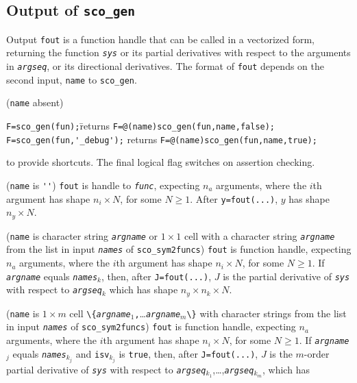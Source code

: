 \documentclass[11pt]{scrartcl}
\newcommand{\blist}[1]{\mbox{\lstinline!#1!}}
\newcommand{\genvar}[1]{\textit{\texttt{#1}}}
\begin{document}
\subsection{Output of \blist{sco_gen}}\label{sec:sco_gen:output}
Output \blist{fout} is a function handle that can be called in a
vectorized form, returning the function \genvar{sys} or its partial
derivatives with respect to the arguments in \genvar{argseq}, or its
directional derivatives. The format of \blist{fout} depends on the second input, \blist{name} to \blist{sco_gen}.
\begin{compactenum}[(i)]
\item (\blist{name} absent)
  \begin{tabbing}
    \blist{F=sco_gen(fun);}\qquad\qquad\quad\= returns 
    \blist{F=@(name)sco_gen(fun,name,false);}\\
    \blist{F=sco_gen(fun,'_debug');}\> returns 
    \blist{F=@(name)sco_gen(fun,name,true);}
  \end{tabbing}
  to provide shortcuts. The final logical flag switches on assertion checking.
\item (\blist{name} is \blist{''}) \blist{fout} is handle to \genvar{func}, expecting
  $n_a$ arguments, where the $i$th argument has shape $n_i\times N$,
  for some $N\geq 1$. After \blist{y=fout(...)}, $y$ has shape
  $n_y\times N$.
\item\label{ch1:out} (\blist{name} is character string \genvar{argname} or $1\times1$ cell with a
  character string \genvar{argname} from the list in input
  \genvar{names} of \blist{sco_sym2funcs}) \blist{fout} is function
  handle, expecting $n_a$ arguments, where the $i$th argument has
  shape $n_i\times N$, for some $N\geq 1$. If \genvar{argname}
  equals \genvar{names}$_k$, then, after \blist{J=fout(...)}, $J$ is
  the partial derivative of \genvar{sys} with respect to
  \genvar{argseq}$_k$ which has shape $n_y\times n_k\times N$.
\item\label{ch2:out} (\blist{name} is $1\times m$ cell
  \blist{\{}\genvar{argname}$_1$\blist{,}\ldots\genvar{argname}$_m$\blist{\}}
  with character strings from the list in input \genvar{names} of
  \blist{sco_sym2funcs}) \blist{fout} is function handle, expecting
  $n_a$ arguments, where the $i$th argument has shape $n_i\times N$,
  for some $N\geq 1$. If \genvar{argname}$_j$ equals
  \genvar{names}$_{k_j}$ and \blist{isv}$_{k_j}$ is \blist{true},
  then, after \blist{J=fout(...)}, $J$ is the $m$-order partial
  derivative of \genvar{sys} with respect to
  \genvar{argseq}$_{k_1}$,\ldots,\genvar{argseq}$_{k_m}$, which has

\end{compactenum}
\end{document}
